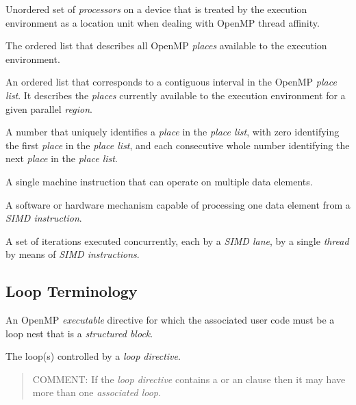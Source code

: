 \newpage
{}
\glossarydefstart
Unordered set of \emph{processors} on a device that is treated by the execution environment as a 
location unit when dealing with OpenMP thread affinity.
\glossarydefend

\glossarydefstart
The ordered list that describes all OpenMP \emph{places} available to the execution 
environment.
\glossarydefend

\glossarydefstart
An ordered list that corresponds to a contiguous interval in the OpenMP \emph{place list}. 
It describes the \emph{places} currently available to the execution environment for a given 
parallel \emph{region}.
\glossarydefend

\glossarydefstart
A number that uniquely identifies a \emph{place} in the \emph{place list}, with zero identifying the first \emph{place} in the \emph{place list}, and each consecutive whole number identifying the next \emph{place} in the \emph{place list}.
\glossarydefend

\glossarydefstart
A single machine instruction that can operate on multiple data elements.
\glossarydefend

\glossarydefstart
A software or hardware mechanism capable of processing one data element from a 
\emph{SIMD instruction}.
\glossarydefend

\glossarydefstart
A set of iterations executed concurrently, each by a \emph{SIMD lane}, by a single \emph{thread}
by means of \emph{SIMD instructions}.
\glossarydefend


%
%
\subsection{Loop Terminology}
\glossarydefstart
An OpenMP \emph{executable} directive for which the associated user code must be a loop nest that is a \emph{structured block}.
\glossarydefend

\glossarydefstart
The loop(s) controlled by a \emph{loop directive}.
\begin{quote}
COMMENT: If the \emph{loop directive} contains a  or an \code{)} clause then it may have more than one \emph{associated loop}.
\end{quote}
\glossarydefend

